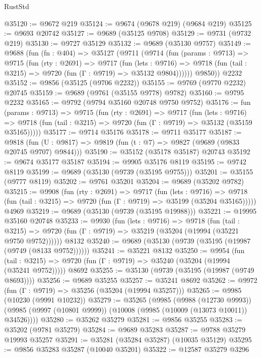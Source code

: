 \begin{lexlean}{RustStd}
\begin{coremodule}
@35120 := @9672 @219
@35124 := @9674 (@9678 @219) (@9684 @219)
@35125 := @9693 @20742
@35127 := @9689 (@35125 @9708)
@35129 := @9731 (@9732 @219)
@35130 := @9727 @35129
@35132 := @9689 (@35130 @9757)
@35149 := @9688
    (fun (fn : @404) =>
    @35127
      (@9711
        (@9714
          (fun (params : @9713) =>
          @9715
            (fun (rty : @2691) =>
            @9717
              (fun (lets : @9716) =>
              @9718 (fun (tail : @3215) => @9720 (fun (Γ : @9719) => @35132 @9804))))))
        @9850))
    @2232
@35152 := @9856 (@35125 (@9706 @2232))
@35155 := @9769 (@9770 @2232) @20745
@35159 := @9689 (@9761 (@35155 @9778) @9782)
@35160 := @9795 @2232
@35165 := @9792 (@9794 @35160 @20748 @9750 @9752)
@35176 := fun (params : @9713) =>
  @9715
    (fun (rty : @2691) =>
    @9717
      (fun (lets : @9716) =>
      @9718 (fun (tail : @3215) => @9720 (fun (Γ : @9719) => @35132 (@35159 @35165)))))
@35177 := @9714 @35176
@35178 := @9711 @35177
@35187 := @9818
    (fun (U : @9817) => @9819 (fun (t : @7) => @9827 (@9689 (@9833 @20745 @9707) @9844)))
@35190 := @35152 (@35178 @35187) @20743
@35192 := @9674 @35177 @35187
@35194 := @9905 @35176 @8119
@35195 := @9742 @8119
@35199 := @9689 (@35130 (@9739 (@35195 @9755)))
@35201 := @35155 (@9777 @8119)
@35202 := @9761 @35201
@35204 := @9689 (@35202 @9782)
@35215 := @9908
    (fun (rty : @2691) =>
    @9717
      (fun (lets : @9716) =>
      @9718 (fun (tail : @3215) => @9720 (fun (Γ : @9719) => @35199 (@35204 @35165)))))
    @4969
@35219 := @9689 (@35130 (@9739 (@35195 @19988)))
@35221 := @19995 @35160 @20748
@35233 := @9930
    (fun (lets : @9716) =>
    @9718
      (fun (tail : @3215) =>
      @9720 (fun (Γ : @9719) => @35219 (@35204 (@19994 (@35221 @9750 @9752))))))
    @8132
@35240 := @9689 (@35130 (@9739 (@35195 (@19987 (@9749 (@8133 @9752))))))
@35241 := @35221 @8132
@35250 := @9954
    (fun (tail : @3215) => @9720 (fun (Γ : @9719) => @35240 (@35204 (@19994 (@35241 @9752)))))
    @8692
@35255 := @35130 (@9739 (@35195 (@19987 (@9749 @8693))))
@35256 := @9689 @35255
@35257 := @35241 @8692
@35262 := @9972 (fun (Γ : @9719) => @35256 (@35204 (@19994 @35257)))
@35265 := @9985 (@10230 (@9991 @10232))
@35279 := @35265
    (@9985
      (@9988 (@12730 @9993))
      (@9985 (@9997 (@10801 @9999)) (@10008 (@9985 (@10009 (@13073 @10011)) @34526))))
@35280 := @35262 @35279
@35281 := @9856 @35255
@35283 := @35202 (@9781 @35279)
@35284 := @9689 @35283
@35287 := @9788 @35279 @19993 @35257
@35291 := @35281 (@35284 @35287) (@10035 @35129)
@35295 := @9856 @35283 @35287 (@10040 @35201)
@35322 := @12587
    @35279
    @3296

\end{coremodule}
\end{lexlean}
